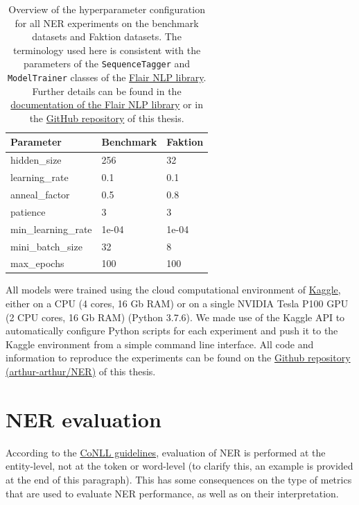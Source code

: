 \documentclass[12pt,a4paper,]{book}
\begin{document}
\begin{table}

\caption{\label{tab:params}Overview of the hyperparameter configuration for all NER experiments on the benchmark datasets and Faktion datasets. The terminology used here is consistent with the parameters of the \texttt{SequenceTagger} and \texttt{ModelTrainer} classes of the \href{https://github.com/flairNLP/flair}{Flair NLP library}. Further details can be found in the \href{https://github.com/flairNLP/flair/tree/master/resources/docs}{documentation of the Flair NLP library} or in the \href{https://github.com/arthur-arthur/NER/}{GitHub repository} of this thesis.}
\centering
\begin{tabular}[t]{lll}
\toprule
Parameter & Benchmark & Faktion\\
\midrule
hidden\_size & 256 & 32\\
learning\_rate & 0.1 & 0.1\\
anneal\_factor & 0.5 & 0.8\\
patience & 3 & 3\\
min\_learning\_rate & 1e-04 & 1e-04\\
\addlinespace
mini\_batch\_size & 32 & 8\\
max\_epochs & 100 & 100\\
\bottomrule
\end{tabular}
\end{table}



All models were trained using the cloud computational environment of \href{https://www.kaggle.com}{Kaggle}, either on a CPU (4 cores, 16 Gb RAM) or on a single NVIDIA Tesla P100 GPU (2 CPU cores, 16 Gb RAM) (Python 3.7.6). We made use of the Kaggle API to automatically configure Python scripts for each experiment and push it to the Kaggle environment from a simple command line interface. All code and information to reproduce the experiments can be found on the \href{https://github.com/arthur-arthur/NER}{Github repository (arthur-arthur/NER)} of this thesis.

\hypertarget{ner-evaluation}{%
\section{NER evaluation}\label{ner-evaluation}}

According to the \href{https://www.clips.uantwerpen.be/conll2000/chunking/output.html}{CoNLL guidelines}, evaluation of NER is performed at the entity-level, not at the token or word-level (to clarify this, an example is provided at the end of this paragraph). This has some consequences on the type of metrics that are used to evaluate NER performance, as well as on their interpretation.
\end{document}

